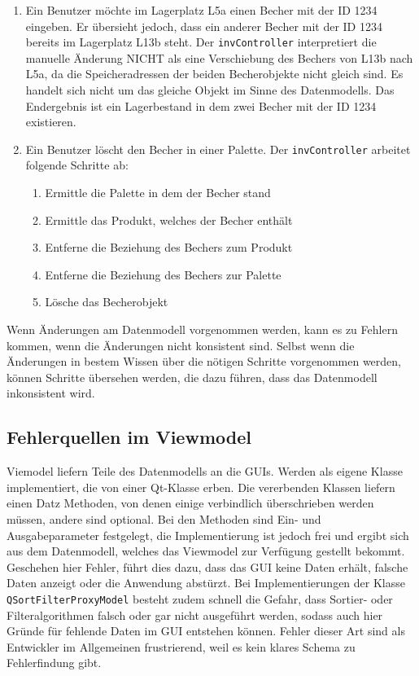 \begin{enumerate}
    \item Ein Benutzer möchte im Lagerplatz L5a einen Becher mit der ID 1234 eingeben. 
    Er übersieht jedoch, dass ein anderer Becher mit der ID 1234 bereits im Lagerplatz L13b steht.
    Der \verb|invController| interpretiert die manuelle Änderung NICHT als eine Verschiebung des Bechers von L13b nach L5a, 
    da die Speicheradressen der beiden Becherobjekte nicht gleich sind. 
    Es handelt sich nicht um das gleiche Objekt im Sinne des Datenmodells.
    Das Endergebnis ist ein Lagerbestand in dem zwei Becher mit der ID 1234 existieren.
    \item Ein Benutzer löscht den Becher in einer Palette. 
    Der \verb|invController| arbeitet folgende Schritte ab: 
    \begin{enumerate}
        \item Ermittle die Palette in dem der Becher stand
        \item Ermittle das Produkt, welches der Becher enthält
        \item Entferne die Beziehung des Bechers zum Produkt
        \item Entferne die Beziehung des Bechers zur Palette
        \item Lösche das Becherobjekt
    \end{enumerate}
\end{enumerate}

Wenn Änderungen am Datenmodell vorgenommen werden, kann es zu Fehlern kommen, wenn die Änderungen nicht konsistent sind.
Selbst wenn die Änderungen in bestem Wissen über die nötigen Schritte vorgenommen werden, können Schritte übersehen werden, 
die dazu führen, dass das Datenmodell inkonsistent wird.

\subsection{Fehlerquellen im Viewmodel}

Viemodel liefern Teile des Datenmodells an die GUIs. Werden als eigene Klasse implementiert, die von einer Qt-Klasse erben.
Die vererbenden Klassen liefern einen Datz Methoden, von denen einige verbindlich überschrieben werden müssen, andere sind optional. 
Bei den Methoden sind Ein- und Ausgabeparameter festgelegt, die Implementierung ist jedoch frei und ergibt sich aus dem Datenmodell,
welches das Viewmodel zur Verfügung gestellt bekommt.
Geschehen hier Fehler, führt dies dazu, dass das GUI keine Daten erhält, falsche Daten anzeigt oder die Anwendung abstürzt.
Bei Implementierungen der Klasse \verb|QSortFilterProxyModel| besteht zudem schnell die Gefahr, dass Sortier- oder Filteralgorithmen
falsch oder gar nicht ausgeführt werden, sodass auch hier Gründe für fehlende Daten im GUI entstehen können.
Fehler dieser Art sind als Entwickler im Allgemeinen frustrierend, weil es kein klares Schema zu Fehlerfindung gibt.

